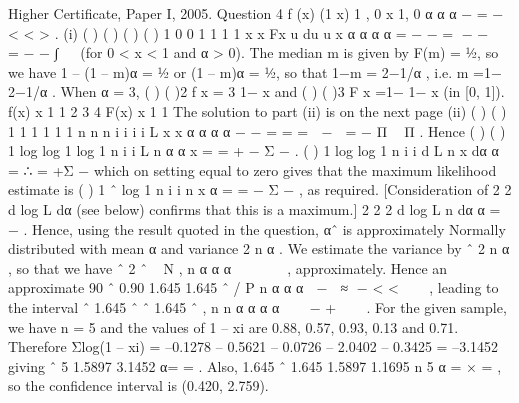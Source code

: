 \documentclass[a4paper,12pt]{article}
\begin{document}
Higher Certificate, Paper I, 2005. Question 4
f (x) (1 x) 1 , 0 x 1, 0 α α α − = − < < > .
(i) ( ) ( ) ( ) ( ) 1
0 0
1 1 1 1
x x Fx u du u x α α α α = − − = − −  = − − ∫   (for 0 < x < 1 and α > 0).
The median m is given by F(m) = ½, so we have 1 – (1 – m)α = ½ or (1 – m)α = ½,
so that 1−m = 2−1/α , i.e. m =1− 2−1/α .
When α = 3, ( ) ( )2 f x = 3 1− x and ( ) ( )3 F x =1− 1− x (in [0, 1]).
f(x)
x
1
1
2
3
4
F(x)
x
1
1
The solution to part (ii) is on the next page
(ii) ( ) ( ) 1 1
1 1
1 1
n n
n
i i
i i
L x x α α α α − −
= =
=  −  = − Π  Π .
Hence ( ) ( )
1
log log 1 log 1
n
i
i
L n α α x
=
= + − Σ − .
( )
1
log log 1
n
i
i
d L n x
dα α =
∴ = +Σ − which on setting equal to zero gives that the maximum
likelihood estimate is
( )
1
ˆ
log 1
n
i
i
n
x
α
=
= −
Σ −
, as required. [Consideration of
2
2
d log L
dα
(see below) confirms that this is a maximum.]
2
2 2
d log L n
dα α
= − . Hence, using the result quoted in the question, αˆ is approximately
Normally distributed with mean α and variance
2
n
α . We estimate the variance by
ˆ 2
n
α ,
so that we have
ˆ 2 ˆ ~ N ,
n
α α α
 
 
 
, approximately.
Hence an approximate 90%
ˆ
0.90 1.645 1.645
ˆ /
P
n
α α
α
 −  ≈ − < < 
 
,
leading to the interval
ˆ 1.645 ˆ ˆ 1.645 ˆ ,
n n
α α α α    − + 
 
.
For the given sample, we have n = 5 and the values of 1 – xi are 0.88, 0.57, 0.93, 0.13
and 0.71. Therefore
Σlog(1 – xi) = –0.1278 – 0.5621 – 0.0726 – 2.0402 – 0.3425 = –3.1452
giving ˆ 5 1.5897
3.1452
α= = .
Also,
1.645 ˆ 1.645 1.5897 1.1695
n 5
α = × = , so the confidence interval is (0.420, 2.759).
\end{document}
